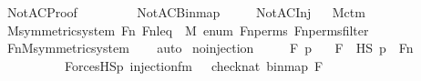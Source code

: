 %
\begin{isabellebody}%
%
%
\isadelimtheory
%
\endisadelimtheory
%
\isatagtheory
{}\isamarkupfalse%
\ NotAC{\isacharunderscore}{\kern0pt}Proof\ \isanewline
\ \ \ \isanewline
\ \ \ \ NotAC{\isacharunderscore}{\kern0pt}Binmap\ \isanewline
\ \ \ \ NotAC{\isacharunderscore}{\kern0pt}Inj\isanewline
{}%
\endisatagtheory
{\isafoldtheory}%
%
\isadelimtheory
\ \isanewline
%
\endisadelimtheory
\isanewline
{}\isamarkupfalse%
\ M{\isacharunderscore}{\kern0pt}ctm\ \ \isanewline
\isanewline
{}\isamarkupfalse%
\ M{\isacharunderscore}{\kern0pt}symmetric{\isacharunderscore}{\kern0pt}system\ {\isachardoublequoteopen}Fn{\isachardoublequoteclose}\ {\isachardoublequoteopen}Fn{\isacharunderscore}{\kern0pt}leq{\isachardoublequoteclose}\ {\isachardoublequoteopen}{}{\isachardoublequoteclose}\ {\isachardoublequoteopen}M{\isachardoublequoteclose}\ {\isachardoublequoteopen}enum{\isachardoublequoteclose}\ {\isachardoublequoteopen}Fn{\isacharunderscore}{\kern0pt}perms{\isachardoublequoteclose}\ {\isachardoublequoteopen}Fn{\isacharunderscore}{\kern0pt}perms{\isacharunderscore}{\kern0pt}filter{\isachardoublequoteclose}\isanewline
%
\isadelimproof
\ \ %
\endisadelimproof
%
\isatagproof
{}\isamarkupfalse%
\ Fn{\isacharunderscore}{\kern0pt}M{\isacharunderscore}{\kern0pt}symmetric{\isacharunderscore}{\kern0pt}system\isanewline
\ \ \isamarkupfalse%
\ auto%
\endisatagproof
{\isafoldproof}%
%
\isadelimproof
\isanewline
%
\endisadelimproof
\isanewline
{}\isamarkupfalse%
\ no{\isacharunderscore}{\kern0pt}injection\ {\isacharcolon}{\kern0pt}\ \isanewline
\ \ \ F{\isacharprime}{\kern0pt}\ p{}\isanewline
\ \ \ {\isachardoublequoteopen}F{\isacharprime}{\kern0pt}\ {\isasymin}\ HS{\isachardoublequoteclose}\ {\isachardoublequoteopen}p{}\ {\isasymin}\ Fn{\isachardoublequoteclose}\ \ \isanewline
\ \ \ \ \ \ \ \ \ \ {\isachardoublequoteopen}ForcesHS{\isacharparenleft}{\kern0pt}p{}{\isacharcomma}{\kern0pt}\ injection{\isacharunderscore}{\kern0pt}fm{\isacharparenleft}{\kern0pt}{}{\isacharcomma}{\kern0pt}\ {}{\isacharcomma}{\kern0pt}\ {}{\isacharparenright}{\kern0pt}{\isacharcomma}{\kern0pt}\ {\isacharbrackleft}{\kern0pt}check{\isacharparenleft}{\kern0pt}nat{\isacharparenright}{\kern0pt}{\isacharcomma}{\kern0pt}\ binmap{\isacharprime}{\kern0pt}{\isacharcomma}{\kern0pt}\ F{\isacharprime}{\kern0pt}{\isacharbrackright}{\kern0pt}{\isacharparenright}{\kern0pt}{\isachardoublequoteclose}\ \isanewline

\end{isabellebody}
